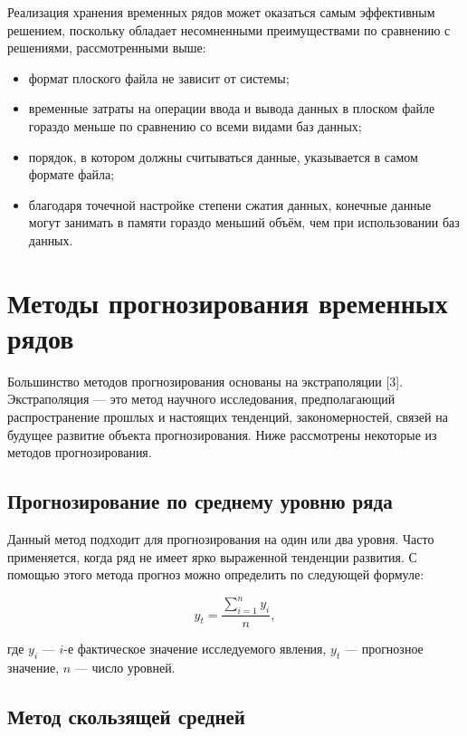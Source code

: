 Реализация хранения временных рядов может оказаться самым эффективным решением, поскольку обладает 
несомненными преимуществами по сравнению с решениями, рассмотренными выше:

\begin{itemize}[label=—]
	\item формат плоского файла не зависит от системы;
	\item временные затраты на операции ввода и вывода данных в плоском файле гораздо меньше по 
сравнению со всеми видами баз данных;
	\item порядок, в котором должны считываться данные, указывается в самом формате файла;
	\item благодаря точечной настройке степени сжатия данных, конечные данные могут занимать в памяти
гораздо меньший объём, чем при использовании баз данных.
\end{itemize}

\section{Методы прогнозирования временных рядов}

Большинство методов прогнозирования основаны на экстраполяции [3]. Экстраполяция — это метод научного 
исследования, предполагающий распространение прошлых и настоящих тенденций, закономерностей, 
связей на будущее развитие объекта прогнозирования. Ниже рассмотрены некоторые из методов прогнозирования.

\subsection{Прогнозирование по среднему уровню ряда}

Данный метод подходит для прогнозирования на один или два уровня. Часто применяется, когда ряд не имеет
ярко выраженной тенденции развития. С помощью этого метода прогноз можно определить по следующей формуле:

\begin{equation}
	y_{t} = \frac{\sum_{i=1}^{n} y_i}{n},
\end{equation}

где $y_{i}$ — $i$-е фактическое значение исследуемого явления, $y_{t}$ — прогнозное значение, 
$n$ — число уровней.

\subsection{Метод скользящей средней}

